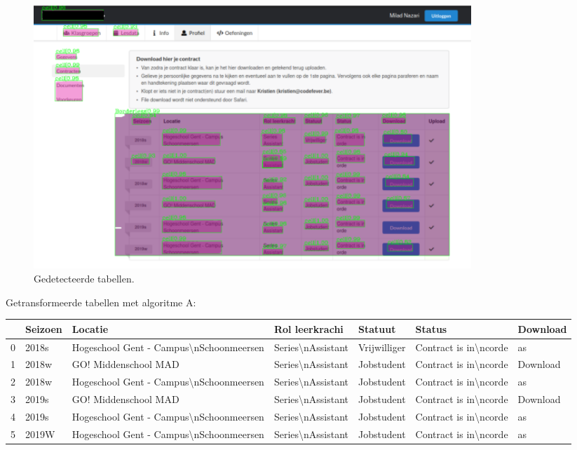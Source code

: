 \begin{figure}[H]
    \centering
    \includegraphics[width=0.8\textwidth]{test-resultaten/16/detected_tables.png}
    \caption{Gedetecteerde tabellen.}
\end{figure}

Getransformeerde tabellen met algoritme A:

\begin{tabular}{lllllll}
\toprule
{} & Seizoen &                                  Locatie &     Rol leerkrachi &       Statuut &                 Status &  Download \\
\midrule
0 &   2018s &  Hogeschool Gent - Campus\textbackslash nSchoonmeersen &  Series\textbackslash nAssistant &  Vrijwilliger &  Contract is in\textbackslash ncorde &        as \\
1 &   2018w &                     GO! Middenschool MAD &  Series\textbackslash nAssistant &    Jobstudent &  Contract is in\textbackslash ncorde &  Download \\
2 &   2018w &  Hogeschool Gent - Campus\textbackslash nSchoonmeersen &  Series\textbackslash nAssistant &    Jobstudent &  Contract is in\textbackslash ncorde &        as \\
3 &   2019s &                     GO! Middenschool MAD &  Series\textbackslash nAssistant &    Jobstudent &  Contract is in\textbackslash ncorde &  Download \\
4 &   2019s &  Hogeschool Gent - Campus\textbackslash nSchoonmeersen &  Series\textbackslash nAssistant &    Jobstudent &  Contract is in\textbackslash ncorde &        as \\
5 &   2019W &  Hogeschool Gent - Campus\textbackslash nSchoonmeersen &  Series\textbackslash nAssistant &    Jobstudent &  Contract is in\textbackslash ncorde &        as \\
\bottomrule
\end{tabular}


